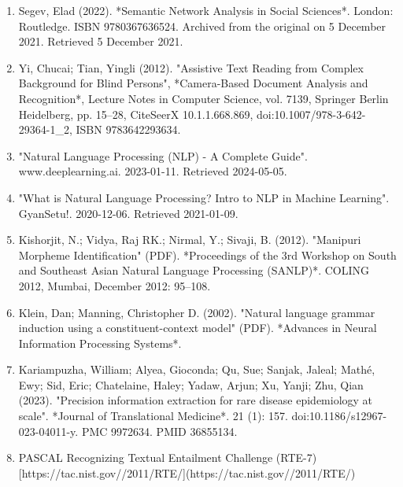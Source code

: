\begin{enumerate}
\item Segev, Elad (2022). *Semantic Network Analysis in Social Sciences*. London: Routledge. ISBN 9780367636524. Archived from the original on 5 December 2021. Retrieved 5 December 2021.  
\item Yi, Chucai; Tian, Yingli (2012). "Assistive Text Reading from Complex Background for Blind Persons", *Camera-Based Document Analysis and Recognition*, Lecture Notes in Computer Science, vol. 7139, Springer Berlin Heidelberg, pp. 15–28, CiteSeerX 10.1.1.668.869, doi:10.1007/978-3-642-29364-1_2, ISBN 9783642293634.  
\item "Natural Language Processing (NLP) - A Complete Guide". www.deeplearning.ai. 2023-01-11. Retrieved 2024-05-05.  
\item "What is Natural Language Processing? Intro to NLP in Machine Learning". GyanSetu!. 2020-12-06. Retrieved 2021-01-09.  
\item Kishorjit, N.; Vidya, Raj RK.; Nirmal, Y.; Sivaji, B. (2012). "Manipuri Morpheme Identification" (PDF). *Proceedings of the 3rd Workshop on South and Southeast Asian Natural Language Processing (SANLP)*. COLING 2012, Mumbai, December 2012: 95–108.  
\item Klein, Dan; Manning, Christopher D. (2002). "Natural language grammar induction using a constituent-context model" (PDF). *Advances in Neural Information Processing Systems*.  
\item Kariampuzha, William; Alyea, Gioconda; Qu, Sue; Sanjak, Jaleal; Mathé, Ewy; Sid, Eric; Chatelaine, Haley; Yadaw, Arjun; Xu, Yanji; Zhu, Qian (2023). "Precision information extraction for rare disease epidemiology at scale". *Journal of Translational Medicine*. 21 (1): 157. doi:10.1186/s12967-023-04011-y. PMC 9972634. PMID 36855134.  
\item PASCAL Recognizing Textual Entailment Challenge (RTE-7) [https://tac.nist.gov//2011/RTE/](https://tac.nist.gov//2011/RTE/)
\end{enumerate}